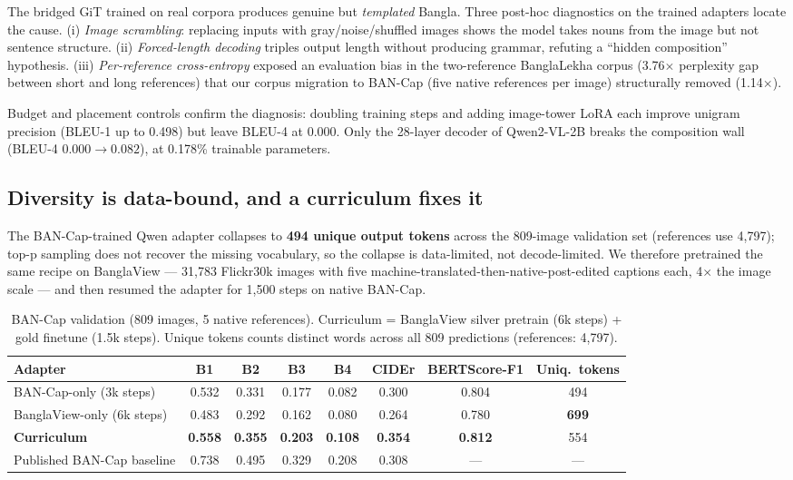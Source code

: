 \documentclass[11pt]{article}
\begin{document}
The bridged GiT trained on real corpora produces genuine but
\emph{templated} Bangla. Three post-hoc diagnostics on the trained
adapters locate the cause. (i) \emph{Image scrambling}: replacing
inputs with gray/noise/shuffled images shows the model takes nouns
from the image but not sentence structure. (ii) \emph{Forced-length
decoding} triples output length without producing grammar, refuting a
``hidden composition'' hypothesis. (iii) \emph{Per-reference
cross-entropy} exposed an evaluation bias in the two-reference
BanglaLekha corpus (3.76$\times$ perplexity gap between short and long
references) that our corpus migration to BAN-Cap \cite{bancap2022}
(five native references per image) structurally removed
(1.14$\times$).

Budget and placement controls confirm the diagnosis: doubling training
steps and adding image-tower LoRA each improve unigram precision
(BLEU-1 up to 0.498) but leave BLEU-4 at 0.000. Only the 28-layer
decoder of Qwen2-VL-2B breaks the composition wall (BLEU-4
$0.000 \to 0.082$), at 0.178\% trainable parameters.

\subsection{Diversity is data-bound, and a curriculum fixes it}
\label{sec:qwen}

The BAN-Cap-trained Qwen adapter collapses to \textbf{494 unique
output tokens} across the 809-image validation set (references use
4{,}797); top-p sampling does not recover the missing vocabulary, so
the collapse is data-limited, not decode-limited. We therefore
pretrained the same recipe on BanglaView --- 31{,}783 Flickr30k images
with five machine-translated-then-native-post-edited captions each,
4$\times$ the image scale --- and then resumed the adapter for 1{,}500
steps on native BAN-Cap.

\begin{table}[t]
\centering
\caption{BAN-Cap validation (809 images, 5 native references).
Curriculum = BanglaView silver pretrain (6k steps) + gold finetune
(1.5k steps). Unique tokens counts distinct words across all 809
predictions (references: 4{,}797).}
\label{tab:curriculum}
\small
\begin{tabular}{lccccccc}
\toprule
Adapter & B1 & B2 & B3 & B4 & CIDEr & BERTScore-F1 & Uniq.\ tokens \\
\midrule
BAN-Cap-only (3k steps) & 0.532 & 0.331 & 0.177 & 0.082 & 0.300 & 0.804 & 494 \\
BanglaView-only (6k steps) & 0.483 & 0.292 & 0.162 & 0.080 & 0.264 & 0.780 & \textbf{699} \\
\textbf{Curriculum} & \textbf{0.558} & \textbf{0.355} & \textbf{0.203} & \textbf{0.108} & \textbf{0.354} & \textbf{0.812} & 554 \\
\midrule
Published BAN-Cap baseline \cite{bancap2022} & 0.738 & 0.495 & 0.329 & 0.208 & 0.308 & --- & --- \\
\bottomrule
\end{tabular}
\end{table}
\end{document}
